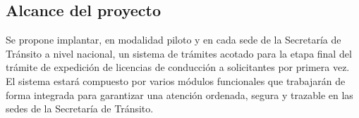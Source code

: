 \subsection{Alcance del proyecto}

Se propone implantar, en modalidad piloto y en cada sede de la Secretaría de Tránsito a nivel nacional, un sistema de trámites acotado para la etapa final del trámite de expedición
de licencias de conducción a solicitantes por primera vez. El sistema estará compuesto por
varios módulos funcionales que trabajarán de forma integrada para garantizar una atención
ordenada, segura y trazable en las sedes de la Secretaría de Tránsito. 